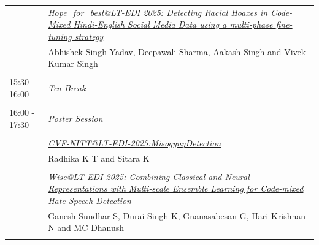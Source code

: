 \documentclass[11pt,oneside]{book}
\begin{document}
\begin{tabular}{p{24mm}p{124mm}}
                      & \hyperlink{page.39}{\emph{Hope\_for\_best@LT-EDI 2025: Detecting Racial Hoaxes in Code-Mixed Hindi-English Social Media Data using a multi-phase fine-tuning strategy}}\\
        & Abhishek Singh Yadav\index{Yadav}, Deepawali Sharma\index{Sharma}, Aakash Singh\index{Singh} and Vivek Kumar Singh\index{Singh}\\\\
                      15:30 - 16:00 & \emph{Tea Break}\\\\
      
                      16:00 - 17:30 & \emph{Poster Session}\\\\
      
                
                      & \hyperlink{page.47}{\emph{CVF-NITT@LT-EDI-2025:MisogynyDetection}}\\
        & Radhika K T\index{T} and Sitara K\index{K}\\\\
                
                      & \hyperlink{page.54}{\emph{Wise@LT-EDI-2025: Combining Classical and Neural Representations with Multi-scale Ensemble Learning for Code-mixed Hate Speech Detection}}\\
        & Ganesh Sundhar S\index{S}, Durai Singh K\index{K}, Gnanasabesan G\index{G}, Hari Krishnan N\index{N} and MC Dhanush\index{Dhanush}\\\\
              \end{tabular}
          \newpage
\end{document}
